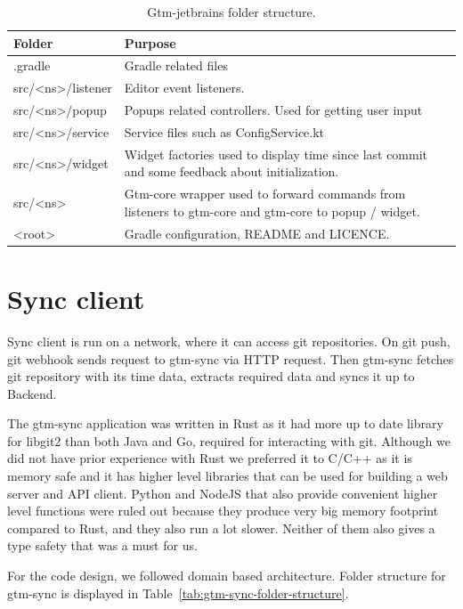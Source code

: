 \begin{table}[h]
    \centering
    \begin{tabular}{ | p{3cm} | p{10cm} |}
        \hline
        Folder & Purpose\\
        \hline
        .gradle & Gradle related files\\
        \hline
        src/<ns>/listener & Editor event listeners.\\
        \hline
        src/<ns>/popup & Popups related controllers.
        Used for getting user input\\
        \hline
        src/<ns>/service & Service files such as ConfigService.kt\\
        \hline
        src/<ns>/widget & Widget factories used to display time since last commit and some feedback about initialization.\\
        \hline
        src/<ns> & Gtm-core wrapper used to forward commands from listeners to gtm-core and gtm-core to popup / widget.\\
        \hline
        <root> & Gradle configuration, README and LICENCE.\\
        \hline
    \end{tabular}
    \caption{Gtm-jetbrains folder structure.}
    \label{tab:gtm-jetbrains-folder-structure}
\end{table}

\section{Sync client}\label{sec:sync-client}
Sync client is run on a network, where it can access git repositories.
On git push, git webhook sends request to gtm-sync via HTTP request.
Then gtm-sync fetches git repository with its time data, extracts required data and syncs it up to Backend.

The gtm-sync application was written in Rust as it had more up to date library for libgit2 than both Java and Go, required for interacting with git.
Although we did not have prior experience with Rust we preferred it to C/C++ as it is memory safe and it has higher level libraries that can be
used for building a web server and API client.
Python and NodeJS that also provide convenient higher level functions were ruled out because they produce very
big memory footprint compared to Rust, and they also run a lot slower.
Neither of them also gives a type safety that was a must for us.

For the code design, we followed domain based architecture.
Folder structure for gtm-sync is displayed in Table~\ref{tab:gtm-sync-folder-structure}.

